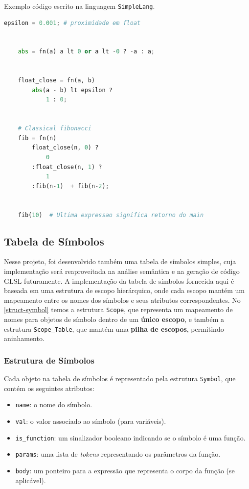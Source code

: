 \documentclass[english, 
               brazil, 
               bsc] %
               {dcomp-abntex2}
\begin{document}
\begin{algoritmo}[H]
        \caption{Exemplo código escrito na linguagem \texttt{SimpleLang}. }
        \label{code-gramatica}
  \begin{lstlisting}[language = python]
    epsilon = 0.001; # proximidade em float


    abs = fn(a) a lt 0 or a lt -0 ? -a : a;


    float_close = fn(a, b) 
        abs(a - b) lt epsilon ? 
            1 : 0;


    # Classical fibonacci
    fib = fn(n)  
        float_close(n, 0) ? 
            0
        :float_close(n, 1) ?
            1
        :fib(n-1)  + fib(n-2);


    fib(10)  # Ultima expressao significa retorno do main
  \end{lstlisting}
\end{algoritmo}


\subsection{Tabela de Símbolos}


Nesse projeto, foi desenvolvido também uma tabela de símbolos simples, cuja implementação será reaproveitada na análise semântica e na geração de código GLSL futuramente. A implementação da tabela de símbolos fornecida aqui é baseada em uma estrutura de escopo hierárquico, onde cada escopo mantém um mapeamento entre os nomes dos símbolos e seus atributos correspondentes. No \autoref{struct-symbol} temos a estrutura \texttt{Scope}, que representa um mapeamento de nomes para objetos de símbolo dentro de um \textbf{único escopo}, e também a estrutura \texttt{Scope\_Table}, que mantém uma \textbf{pilha de escopos}, permitindo aninhamento.


\subsubsection{Estrutura de Símbolos}


Cada objeto na tabela de símbolos é representado pela estrutura \texttt{Symbol}, que contém os seguintes atributos:
\begin{itemize}
    \item \texttt{name}: o nome do símbolo.
    \item \texttt{val}: o valor associado ao símbolo (para variáveis).
    \item \texttt{is\_function}: um sinalizador booleano indicando se o símbolo é uma função.
    \item \texttt{params}: uma lista de \textit{tokens} representando os parâmetros da função.
    \item \texttt{body}: um ponteiro para a expressão que representa o corpo da função (se aplicável).
\end{itemize}
\end{document}
